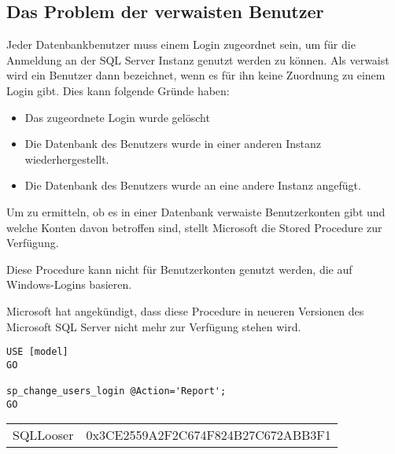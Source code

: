         \subsection{Das Problem der verwaisten Benutzer}
          Jeder Datenbankbenutzer muss einem Login zugeordnet sein, um für die
          Anmeldung an der SQL Server Instanz genutzt werden zu können. Als
          verwaist wird ein Benutzer dann bezeichnet, wenn es für ihn keine
          Zuordnung zu einem Login gibt. Dies kann folgende Gründe haben:
          \begin{itemize}
            \item Das zugeordnete Login wurde gelöscht
            \item Die Datenbank des Benutzers wurde in einer anderen Instanz
            wiederhergestellt.
            \item Die Datenbank des Benutzers wurde an eine andere Instanz
            angefügt.
          \end{itemize}
          Um zu ermitteln, ob es in einer Datenbank verwaiste Benutzerkonten
          gibt und welche Konten davon betroffen sind, stellt Microsoft die
          Stored Procedure  zur
          Verfügung.
          \begin{merke}
            Diese Procedure kann nicht für Benutzerkonten genutzt werden, die
            auf Windows-Logins basieren.
            
            Microsoft hat angekündigt, dass diese Procedure in neueren
            Versionen des Microsoft SQL Server nicht mehr zur Verfügung stehen
            wird.
          \end{merke}
          \begin{lstlisting}[language=ms_sql, caption={Ermitteln der
            verwaisten Benutzerkonten}, label=admin19_08f]
USE [model]
GO

sp_change_users_login @Action='Report';
GO
          \end{lstlisting}
          \begin{center}
            \begin{small}
              \tablehead{}
              \tabletail {
              }
              \tablelasttail {
              }
              \begin{mssql}
                \begin{supertabular}{ll}
                  SQLLooser & 0x3CE2559A2F2C674F824B27C672ABB3F1 \\
                \end{supertabular}
              \end{mssql}
            \end{small}
          \end{center}
